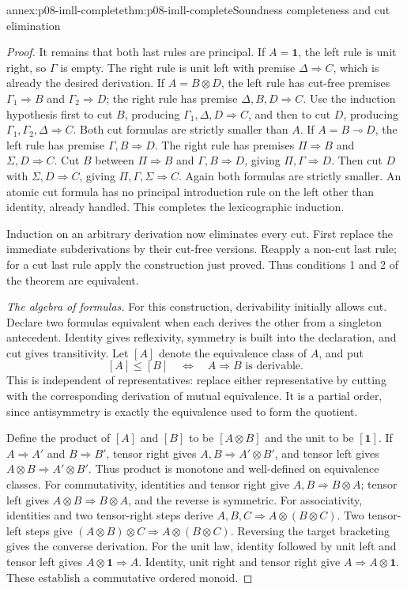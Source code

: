\begin{annexitem}{annex:p08-imll-complete}{thm:p08-imll-complete}{Soundness completeness and cut elimination}
\begin{proof}
It remains that both last rules are principal.
If \(A=\mathbf1\), the left rule is unit right, so \(\Gamma\)
is empty. The right rule is unit left with premise
\(\Delta\Rightarrow C\), which is already the desired derivation.
If \(A=B\otimes D\), the left rule has cut-free premises
\(\Gamma_1\Rightarrow B\) and \(\Gamma_2\Rightarrow D\);
the right rule has premise \(\Delta,B,D\Rightarrow C\).
Use the induction hypothesis first to cut \(B\), producing
\(\Gamma_1,\Delta,D\Rightarrow C\), and then to cut \(D\),
producing \(\Gamma_1,\Gamma_2,\Delta\Rightarrow C\).
Both cut formulas are strictly smaller than \(A\).
If \(A=B\multimap D\), the left rule has premise
\(\Gamma,B\Rightarrow D\). The right rule has premises
\(\Pi\Rightarrow B\) and \(\Sigma,D\Rightarrow C\).
Cut \(B\) between \(\Pi\Rightarrow B\) and
\(\Gamma,B\Rightarrow D\), giving
\(\Pi,\Gamma\Rightarrow D\). Then cut \(D\) with
\(\Sigma,D\Rightarrow C\), giving
\(\Pi,\Gamma,\Sigma\Rightarrow C\).
Again both formulas are strictly smaller.
An atomic cut formula has no principal introduction rule on the left
other than identity, already handled.
This completes the lexicographic induction.

Induction on an arbitrary derivation now eliminates every cut.
First replace the immediate subderivations by their cut-free versions.
Reapply a non-cut last rule; for a cut last rule apply the construction
just proved. Thus conditions 1 and 2 of the theorem are equivalent.

\emph{The algebra of formulas.}
For this construction, derivability initially allows cut.
Declare two formulas equivalent when each derives the other from a
singleton antecedent. Identity gives reflexivity, symmetry is built
into the declaration, and cut gives transitivity. Let \([A]\) denote
the equivalence class of \(A\), and put
\[
 [A]\leq[B]\quad\Longleftrightarrow\quad
 A\Rightarrow B\text{ is derivable}.
\]
This is independent of representatives: replace either representative
by cutting with the corresponding derivation of mutual equivalence.
It is a partial order, since antisymmetry is exactly the equivalence
used to form the quotient.

Define the product of \([A]\) and \([B]\) to be \([A\otimes B]\)
and the unit to be \([\mathbf1]\).
If \(A\Rightarrow A'\) and \(B\Rightarrow B'\), tensor right gives
\(A,B\Rightarrow A'\otimes B'\), and tensor left gives
\(A\otimes B\Rightarrow A'\otimes B'\).
Thus product is monotone and well-defined on equivalence classes.
For commutativity, identities and tensor right give
\(A,B\Rightarrow B\otimes A\); tensor left gives
\(A\otimes B\Rightarrow B\otimes A\), and the reverse is symmetric.
For associativity, identities and two tensor-right steps derive
\(A,B,C\Rightarrow A\otimes(B\otimes C)\).
Two tensor-left steps give
\((A\otimes B)\otimes C\Rightarrow A\otimes(B\otimes C)\).
Reversing the target bracketing gives the converse derivation.
For the unit law, identity followed by unit left and tensor left
gives \(A\otimes\mathbf1\Rightarrow A\).
Identity, unit right and tensor right give
\(A\Rightarrow A\otimes\mathbf1\).
These establish a commutative ordered monoid.


\end{proof}
\end{annexitem}
